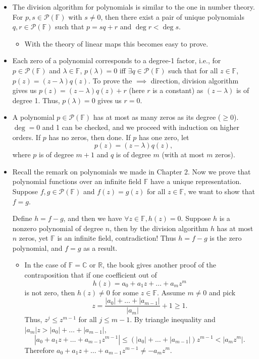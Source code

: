 \documentclass{article}
\newcommand{\R}{\mathbb{R}}
\newcommand{\C}{\mathbb{C}}
\newcommand{\F}{\mathbb{F}}
\newcommand{\PF}{\mathcal{P}(\F)}
\begin{document}
\begin{itemize}
    \item The division algorithm for polynomials is similar to the one in number theory. For $p,s \in \mathcal{P}(\F)$ with $s \not= 0$, then there exist a pair of unique polynomials $q,r \in \mathcal{P}(\F)$ such that $p=sq+r$ and $\deg r < \deg s$.
    \begin{itemize}
        \item With the theory of linear maps this becomes easy to prove.
    \end{itemize}
    \item Each zero of a polynomial corresponds to a degree-1 factor, i.e., for $p \in \PF$ and $\lambda \in \F$, $p(\lambda) = 0$ iff $\exists q \in \PF$ such that for all $z \in \F$, $p(z) = (z-\lambda)q(z)$. To prove the $\implies$ direction, division algorithm gives us $p(z) = (z-\lambda)q(z) + r$ (here $r$ is a constant) as $(z-\lambda)$ is of degree 1. Thus, $p(\lambda) = 0$ gives us $r=0$.
    
    \item A polynomial $p \in \PF$ has at most as many zeros as its degree ($\geq 0$). $\deg = 0$ and 1 can be checked, and we proceed with induction on higher orders. If $p$ has no zeros, then done. If $p$ has one zero, let $$p(z) = (z-\lambda)q(z),$$ where $p$ is of degree $m+1$ and $q$ is of degree $m$ (with at most $m$ zeros).
    
    \item Recall the remark on polynomials we made in Chapter 2. Now we prove that polynomial functions over an infinite field $\F$ have a unique representation. Suppose $f,g \in \PF$ and $f(z)=g(z)$ for all $z \in \F$, we want to show that $f=g$.
    
    Define $h = f-g$, and then we have $\forall z\in\F, h(z) = 0$. Suppose $h$ is a nonzero polynomial of degree $n$, then by the division algorithm $h$ has at most $n$ zeros, yet $\F$ is an infinite field, contradiction! Thus $h = f-g$ is the zero polynomial, and $f = g$ as a result.
    
    \begin{itemize}
        \item In the case of $\F = \C$ or $\R$, the book gives another proof of the contraposition that if one coefficient out of $$h(z) = a_0+a_1z+\dots+a_mz^m$$ is not zero, then $h(z) \not= 0$ for some $z \in \F$. Assume $m \not= 0$ and pick $$z = \frac{|a_0| + \dots + |a_{m-1}|}{|a_m|}+1 \geq 1.$$ Thus, $z^j \leq z^{m-1}$ for all $j \leq m-1$. By triangle inequality and $|a_m|z > |a_0|+ \dots + |a_{m-1}|$, $$|a_0+a_1z+\dots+a_{m-1}z^{m-1}| \leq (|a_0|+\dots+|a_{m-1}|)z^{m-1}< |a_m z^m|.$$ Therefore $a_0+a_1z+\dots+a_{m-1}z^{m-1} \not= -a_m z^m$.
    \end{itemize}
    

\end{itemize}
\end{document}
